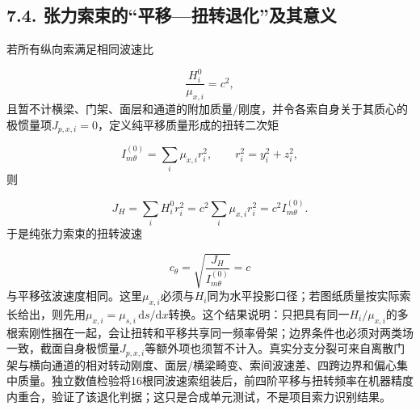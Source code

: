 \documentclass[UTF8,a4paper,11pt,fontset=none]{ctexart}
\begin{document}
\subsection*{7.4. 张力索束的“平移—扭转退化”及其意义}
若所有纵向索满足相同波速比\par
\[
\frac{H_i^0}{\mu_{x,i}}=c^2,
\]
且暂不计横梁、门架、面层和通道的附加质量/刚度，并令各索自身关于其质心的极惯量项\(J_{p,\allowbreak x,\allowbreak i}=0\)\allowbreak{}，定义纯平移质量形成的扭转二次矩\par
\[
I_{m\theta}^{(0)}=\sum_i\mu_{x,i}r_i^2,
\qquad r_i^2=y_i^2+z_i^2,
\]
则\par
\[
J_H=\sum_iH_i^0r_i^2
=c^2\sum_i\mu_{x,i}r_i^2
=c^2I_{m\theta}^{(0)}.
\]
于是纯张力索束的扭转波速\par
\[
c_\theta=\sqrt{\frac{J_H}{I_{m\theta}^{(0)}}}=c
\]
与平移弦波速度相同。这里\(\mu_{x,\allowbreak i}\)\allowbreak{}必须与\(H_i\)\allowbreak{}同为水平投影口径；若图纸质量按实际索长给出，则先用\(\mu_{x,\allowbreak i}=\mu_{s,\allowbreak i}\,\allowbreak \mathrm ds/\mathrm dx\)\allowbreak{}转换。这个结果说明：只把具有同一\(H_i/\mu_{x,\allowbreak i}\)\allowbreak{}的多根索刚性捆在一起，会让扭转和平移共享同一频率骨架；边界条件也必须对两类场一致，截面自身极惯量\(J_{p,\allowbreak x,\allowbreak i}\)\allowbreak{}等额外项也须暂不计入。真实分支分裂可来自离散门架与横向通道的相对转动刚度、面层/横梁畸变、索间波速差、四跨边界和偏心集中质量。独立数值检验将16根同波速索组装后，前四阶平移与扭转频率在机器精度内重合，验证了该退化判据；这只是合成单元测试，不是项目索力识别结果。\par
{}
\end{document}
